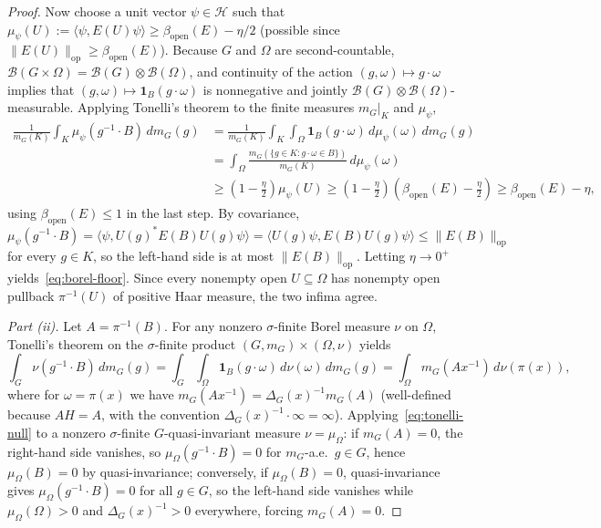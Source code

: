 \documentclass[11pt,a4paper]{article}
\theoremstyle{definition}
\theoremstyle{remark}
\newcommand{\HH}{\mathcal{H}}
\newcommand{\Bor}{\mathcal{B}}
\newcommand{\op}{\mathrm{op}}
\newcommand{\one}{\mathbf{1}}
\newcommand{\ip}[2]{\langle #1, #2 \rangle}
\newcommand{\norm}[1]{\|#1\|}
\begin{document}
\begin{proof}
Now choose a unit vector $\psi\in\HH$ such that $\mu_\psi(U):=\ip{\psi}{E(U)\psi} \ge \beta_{\mathrm{open}}(E) - \eta/2$ (possible since $\norm{E(U)}_{\op}\ge\beta_{\mathrm{open}}(E)$). Because $G$ and $\Omega$ are second-countable, $\Bor(G\times\Omega)=\Bor(G)\otimes\Bor(\Omega)$, and continuity of the action $(g,\omega)\mapsto g\cdot\omega$ implies that $(g,\omega)\mapsto \one_B(g\cdot\omega)$ is nonnegative and jointly $\Bor(G)\otimes\Bor(\Omega)$-measurable. Applying Tonelli's theorem to the finite measures $m_G|_K$ and $\mu_\psi$,
\begin{align*}
\frac{1}{m_G(K)}\int_K \mu_\psi(g^{-1}\cdot B)\,dm_G(g)
&= \frac{1}{m_G(K)}\int_K\int_\Omega \one_B(g\cdot\omega)\,d\mu_\psi(\omega)\,dm_G(g) \\
&= \int_\Omega \frac{m_G(\{g\in K : g\cdot\omega\in B\})}{m_G(K)}\,d\mu_\psi(\omega) \\
&\ge \left(1-\frac{\eta}{2}\right)\mu_\psi(U)
\ge \left(1-\frac{\eta}{2}\right)\left(\beta_{\mathrm{open}}(E)-\frac{\eta}{2}\right)
\ge \beta_{\mathrm{open}}(E) - \eta,
\end{align*}
using $\beta_{\mathrm{open}}(E)\le 1$ in the last step. By covariance, $\mu_\psi(g^{-1}\cdot B)=\ip{\psi}{U(g)^*E(B)U(g)\psi}=\ip{U(g)\psi}{E(B)U(g)\psi}\le\norm{E(B)}_{\op}$ for every $g\in K$, so the left-hand side is at most $\norm{E(B)}_{\op}$. Letting $\eta\to 0^+$ yields~\eqref{eq:borel-floor}. Since every nonempty open $U\subseteq\Omega$ has nonempty open pullback $\pi^{-1}(U)$ of positive Haar measure, the two infima agree.

\emph{Part (ii).} Let $A=\pi^{-1}(B)$. For any nonzero $\sigma$-finite Borel measure $\nu$ on $\Omega$, Tonelli's theorem on the $\sigma$-finite product $(G,m_G)\times(\Omega,\nu)$ yields
\begin{equation}\label{eq:tonelli-null}
\int_G \nu(g^{-1}\cdot B)\,dm_G(g)
= \int_G\int_\Omega \one_B(g\cdot\omega)\,d\nu(\omega)\,dm_G(g)
= \int_\Omega m_G(Ax^{-1})\,d\nu(\pi(x)),
\end{equation}
where for $\omega=\pi(x)$ we have $m_G(Ax^{-1})=\Delta_G(x)^{-1}m_G(A)$ (well-defined because $AH=A$, with the convention $\Delta_G(x)^{-1}\cdot\infty=\infty$). Applying~\eqref{eq:tonelli-null} to a nonzero $\sigma$-finite $G$-quasi-invariant measure $\nu=\mu_\Omega$: if $m_G(A)=0$, the right-hand side vanishes, so $\mu_\Omega(g^{-1}\cdot B)=0$ for $m_G$-a.e.\ $g\in G$, hence $\mu_\Omega(B)=0$ by quasi-invariance; conversely, if $\mu_\Omega(B)=0$, quasi-invariance gives $\mu_\Omega(g^{-1}\cdot B)=0$ for all $g\in G$, so the left-hand side vanishes while $\mu_\Omega(\Omega)>0$ and $\Delta_G(x)^{-1}>0$ everywhere, forcing $m_G(A)=0$.


\end{proof}
\end{document}
